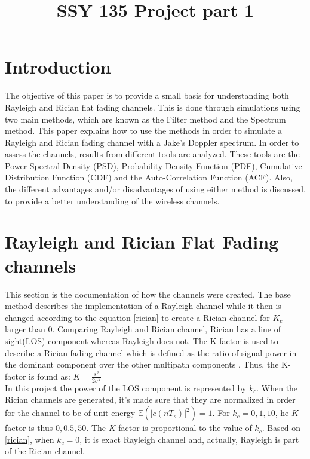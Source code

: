 \documentclass[conference]{IEEEtran}
\begin{document}
\thispagestyle{fancy}
\cfoot{}
\renewcommand{\headrulewidth}{0pt}
\renewcommand{\footrulewidth}{0pt}
\pagestyle{fancy}
\rfoot{\thepage}
\title{SSY 135 Project part 1}


\author{

\and
{}
\and
{}
\and
{}
\and
{}
}

\maketitle

\section{Introduction}
The objective of this paper is to provide a small basis for understanding both Rayleigh and Rician flat fading channels. This is done through simulations using two main methods, which are known as the Filter method and the Spectrum method. This paper explains how to use the methods in order to simulate a Rayleigh and Rician fading channel with a Jake's Doppler spectrum. In order to assess the channels, results from different tools are analyzed. These tools are the Power Spectral Density (PSD), Probability Density Function (PDF), Cumulative Distribution Function (CDF) and the Auto-Correlation Function (ACF). Also, the different advantages and/or disadvantages of using either method is discussed, to provide a better understanding of the wireless channels.

\section{Rayleigh and Rician Flat Fading channels}
This section is the documentation of how the channels were created. The base method describes the implementation of a Rayleigh channel while it then is changed according to the equation \ref{rician} to create a Rician channel for $K_{c}$ larger than $0$. Comparing Rayleigh and Rician channel, Rician has a line of sight(LOS) component whereas Rayleigh does not.  The K-factor is used to describe a Rician fading channel which is defined as the ratio of signal power in the dominant component  over the other multipath components . Thus, the K-factor is found as:  $K = \frac{s^2}{2\sigma ^2}$ \\In this project the power of the LOS component is represented by $k_{c}$. When the Rician channels are generated, it's made sure that they are normalized in order for the channel to be of unit energy $ \mathbb{E}(|c(nT_{s})|^2) = 1$. For $k_{c} = 0,1,10$, he $K$ factor is thus $0, 0.5, 50$. The $K$ factor is proportional to the value of $k_c$. Based on \ref{rician}, when $k_{c} = 0$, it is exact Rayleigh channel and, actually, Rayleigh is part of the Rician channel. 
\end{document}

